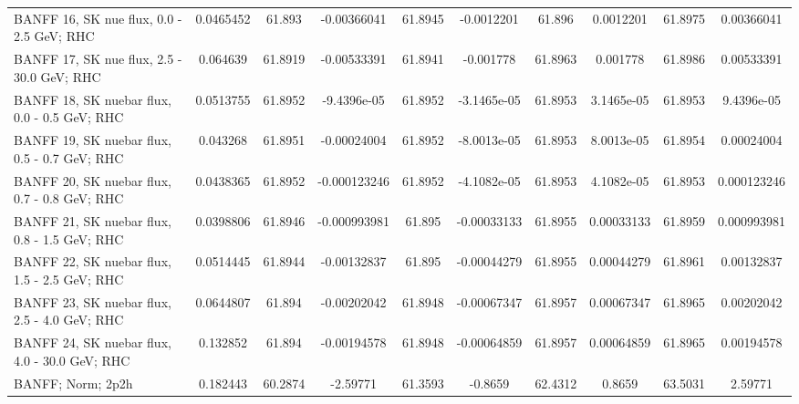 \begin{tabular}{| l | S | S  S | S  S | S  S | S  S | }
                                       BANFF 16, SK nue flux, 0.0 - 2.5 GeV; RHC &       0.0465452 &          61.893 &     -0.00366041 &         61.8945 &      -0.0012201 &          61.896 &       0.0012201 &         61.8975 &      0.00366041 \\ 
                                      BANFF 17, SK nue flux, 2.5 - 30.0 GeV; RHC &        0.064639 &         61.8919 &     -0.00533391 &         61.8941 &       -0.001778 &         61.8963 &        0.001778 &         61.8986 &      0.00533391 \\ 
                                    BANFF 18, SK nuebar flux, 0.0 - 0.5 GeV; RHC &       0.0513755 &         61.8952 &     -9.4396e-05 &         61.8952 &     -3.1465e-05 &         61.8953 &      3.1465e-05 &         61.8953 &      9.4396e-05 \\ 
                                    BANFF 19, SK nuebar flux, 0.5 - 0.7 GeV; RHC &        0.043268 &         61.8951 &     -0.00024004 &         61.8952 &     -8.0013e-05 &         61.8953 &      8.0013e-05 &         61.8954 &      0.00024004 \\ 
                                    BANFF 20, SK nuebar flux, 0.7 - 0.8 GeV; RHC &       0.0438365 &         61.8952 &    -0.000123246 &         61.8952 &     -4.1082e-05 &         61.8953 &      4.1082e-05 &         61.8953 &     0.000123246 \\ 
                                    BANFF 21, SK nuebar flux, 0.8 - 1.5 GeV; RHC &       0.0398806 &         61.8946 &    -0.000993981 &          61.895 &     -0.00033133 &         61.8955 &      0.00033133 &         61.8959 &     0.000993981 \\ 
                                    BANFF 22, SK nuebar flux, 1.5 - 2.5 GeV; RHC &       0.0514445 &         61.8944 &     -0.00132837 &          61.895 &     -0.00044279 &         61.8955 &      0.00044279 &         61.8961 &      0.00132837 \\ 
                                    BANFF 23, SK nuebar flux, 2.5 - 4.0 GeV; RHC &       0.0644807 &          61.894 &     -0.00202042 &         61.8948 &     -0.00067347 &         61.8957 &      0.00067347 &         61.8965 &      0.00202042 \\ 
                                   BANFF 24, SK nuebar flux, 4.0 - 30.0 GeV; RHC &        0.132852 &          61.894 &     -0.00194578 &         61.8948 &     -0.00064859 &         61.8957 &      0.00064859 &         61.8965 &      0.00194578 \\ 
                                                               BANFF; Norm; 2p2h &        0.182443 &         60.2874 &        -2.59771 &         61.3593 &         -0.8659 &         62.4312 &          0.8659 &         63.5031 &         2.59771 \\ 

\end{tabular}
